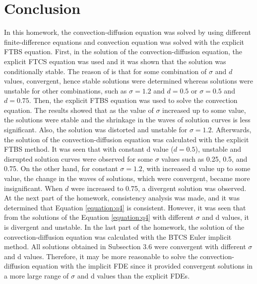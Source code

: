 \documentclass[letterpaper,12pt]{article}
\begin{document}
\newpage

\section{Conclusion}
In this homework, the convection-diffusion equation was solved by using different
finite-difference equations and convection equation was solved with the explicit
FTBS equation. First, in the solution of the convection-diffusion equation,
the explicit FTCS equation was used and it was shown that the solution was
conditionally stable. The reason of is that for some combination of $\sigma$ and $d$ values,
convergent, hence stable solutions were determined whereas solutions were unstable
for other combinations, such as $\sigma =1.2$ and $d=0.5$ or  $\sigma =0.5$ and $d=0.75$.
Then, the explicit FTBS equation was used to solve the convection equation. The results showed
that as the value of $\sigma$ increased up to some value, the solutions were stable and
the shrinkage in the waves of solution curves is less significant. Also, the solution
was distorted and unstable for $\sigma=1.2$. Afterwards, the solution of the convection-diffusion equation was calculated with the explicit FTBS method. It was seen that
with constant d value ($d=0.5$), unstable and disrupted solution curves were observed
for some $\sigma$ values such as 0.25, 0.5, and 0.75. On the other hand, for constant 
$\sigma=1.2$, with increased d value up to some value, the change in the waves of solutions,
which were convergent, became more insignificant. When $d$ were increased to 0.75, a divergent
solution was observed. At the next part of the homework, consistency analysis was made,
and it was determined that Equation \ref{equation:q4} is consistent. However, it was seen that
from the solutions of the Equation \ref{equation:q4} with different $\sigma$ and d values,
it is divergent and unstable. In the last part of the homework, the solution of the convection-diffusion equation was calculated with the BTCS Euler implicit method. All solutions obtained in
Subsection 3.6 were convergent with different $\sigma$ and d values. Therefore, it may be more
reasonable to solve the convection-diffusion equation with the implicit FDE since it provided convergent
solutions in a more large range of $\sigma$ and d values than the explicit FDEs.
\end{document}
